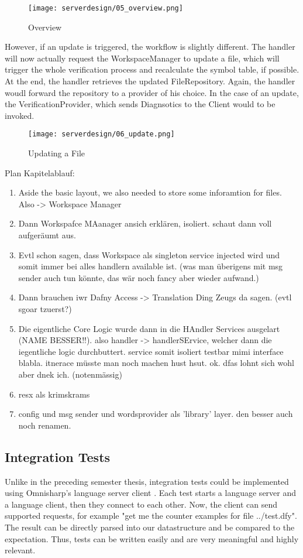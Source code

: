 \begin{figure}[H]
    \centering
    \texttt{[image: serverdesign/05\_overview.png]}
    \caption{Overview}
    \label{fig:server_overview}
\end{figure}


However, if an update is triggered, the workflow is slightly different. The handler will now actually request the WorkspaceManager to update a file, which will trigger the whole verification process and recalculate the symbol table, if possible. At the end, the handler retrieves the updated FileRepository. Again, the handler woudl forward the repository to a provider of his choice. In the case of an update, the VerificationProvider, which sends Diagnsotics to the Client would to be invoked.

\begin{figure}[H]
    \centering
    \texttt{[image: serverdesign/06\_update.png]}
    \caption{Updating a File}
    \label{fig:server_update}
\end{figure}


Plan Kapitelablauf:
\begin{enumerate}
    \item Aside the basic layout, we also needed to store some inforamtion for files. Also -> Workspace Manager
    \item Dann Workspafce MAanager ansich erklären, isoliert. schaut dann voll aufgeräumt aus.
    \item Evtl schon sagen, dass Workspace als singleton service injected wird und somit immer bei alles handlern available ist. (was man überigens mit msg sender auch tun könnte, das wär noch fancy aber wieder aufwand.)
    \item Dann brauchen iwr Dafny Access -> Translation Ding Zeugs da sagen. (evtl sgoar tzuerst?)
    \item Die eigentliche Core Logic wurde dann in die HAndler Services ausgelart (NAME BESSER!!). also handler -> handlerSErvice, welcher dann die iegentliche logic durchbuttert. service somit isoliert testbar mimi interface blabla. itnerace müsste man noch machen hust hsut. ok. dfas lohnt sich wohl aber dnek ich. (notenmässig)
    \item resx als krimskrams
    \item config und msg sender und wordsprovider als 'library' layer. den besser auch noch renamen.
\end{enumerate}

\subsection{Integration Tests}
\label{chapter:designTests}
Unlike in the preceding semester thesis, integration tests could be implemented using Omnisharp's language server client \cite{omnisharpClient}. Each test starts a language server and a language client, then they connect to each other. Now, the client can send supported requests, for example "get me the counter examples for file ../test.dfy". The result can be directly parsed into our  datastructure and be compared to the expectation. Thus, tests can be written easily and are very meaningful and highly relevant.

